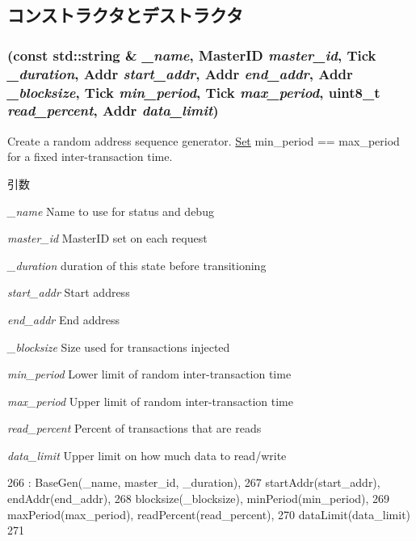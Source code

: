 \subsection{コンストラクタとデストラクタ}
\hypertarget{classRandomGen_adee762769ba5fd3bc9fe1224c8f7ee78}{
\subsubsection[{RandomGen}]{ (const std::string \& {\em \_\-name}, \/  {\bf MasterID} {\em master\_\-id}, \/  {\bf Tick} {\em \_\-duration}, \/  {\bf Addr} {\em start\_\-addr}, \/  {\bf Addr} {\em end\_\-addr}, \/  {\bf Addr} {\em \_\-blocksize}, \/  {\bf Tick} {\em min\_\-period}, \/  {\bf Tick} {\em max\_\-period}, \/  uint8\_\-t {\em read\_\-percent}, \/  {\bf Addr} {\em data\_\-limit})}}
\label{classRandomGen_adee762769ba5fd3bc9fe1224c8f7ee78}
Create a random address sequence generator. \hyperlink{classSet}{Set} min\_\-period == max\_\-period for a fixed inter-\/transaction time.


\begin{DoxyParams}{引数}
\item[{\em \_\-name}]Name to use for status and debug \item[{\em master\_\-id}]MasterID set on each request \item[{\em \_\-duration}]duration of this state before transitioning \item[{\em start\_\-addr}]Start address \item[{\em end\_\-addr}]End address \item[{\em \_\-blocksize}]Size used for transactions injected \item[{\em min\_\-period}]Lower limit of random inter-\/transaction time \item[{\em max\_\-period}]Upper limit of random inter-\/transaction time \item[{\em read\_\-percent}]Percent of transactions that are reads \item[{\em data\_\-limit}]Upper limit on how much data to read/write \end{DoxyParams}



\begin{DoxyCode}
266         : BaseGen(_name, master_id, _duration),
267           startAddr(start_addr), endAddr(end_addr),
268           blocksize(_blocksize), minPeriod(min_period),
269           maxPeriod(max_period), readPercent(read_percent),
270           dataLimit(data_limit)
271     { }
\end{DoxyCode}


